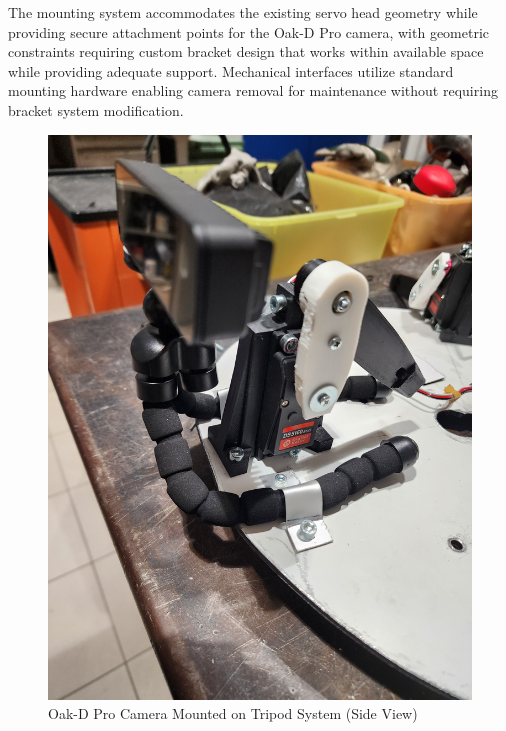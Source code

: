 The mounting system accommodates the existing servo head geometry while providing secure attachment points for the Oak-D Pro camera, with geometric constraints requiring custom bracket design that works within available space while providing adequate support. Mechanical interfaces utilize standard mounting hardware enabling camera removal for maintenance without requiring bracket system modification.

\begin{figure}[H]
    \centering
    \begin{minipage}{0.45\textwidth}
        \centering
        \includegraphics[width=\textwidth, angle=-90]{Images/TripodOnHeadCamera (3).jpg}
        \caption{Oak-D Pro Camera Mounted on Tripod System (Side View)}
        \label{fig:tripod_camera_mount_side}
    \end{minipage}
    \hfill
    \begin{minipage}{0.45\textwidth}
        \centering

\end{minipage}
\end{figure}
